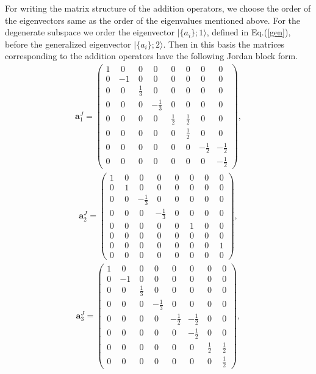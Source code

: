 \documentclass[11pt,a4paper]{book}
\begin{document}
For writing the matrix structure of the addition operators, we choose 
the  order of the eigenvectors same  
as the order of the eigenvalues mentioned above. For the degenerate subspace we 
order the eigenvector $|\{a_i\};1\rangle$, defined in 
Eq.(\ref{gen}), before the generalized eigenvector $|\{a_i\};2\rangle$.  Then in 
this basis the matrices corresponding to the addition operators have the 
following Jordan block form. \begin{align}
 \textbf{a}^J_1 = 
  \begin{pmatrix}
    1 ~&~ 0 ~&~ 0 ~&~ 0 ~&~ 0 ~&~ 0 ~&~ 0 ~&~ 0 \\
    0 ~& -1 &~ 0 ~&~ 0 ~&~ 0 ~&~ 0 ~&~ 0 ~&~ 0 \\
    0 ~&~ 0 ~&~ \frac{1}{3} ~&~ 0 ~&~ 0 ~&~ 0 ~&~ 0 ~&~ 0 \\
    0 ~&~ 0 ~&~ 0 ~& -\frac{1}{3} &~ 0 ~&~ 0 ~&~ 0 ~&~ 0 \\
    0 ~&~ 0 ~&~ 0 ~&~ 0 ~&~ \frac{1}{2} ~&~ \frac{1}{2} ~&~ 0 ~&~ 0 \\
    0 ~&~ 0 ~&~ 0 ~&~ 0 ~&~ 0 ~&~ \frac{1}{2} ~&~ 0 ~&~ 0 \\
    0 ~&~ 0 ~&~ 0 ~&~ 0 ~&~ 0 ~&~ 0 ~& -\frac{1}{2} & -\frac{1}{2} \\
    0 ~&~ 0 ~&~ 0 ~&~ 0 ~&~ 0 ~&~ 0 ~&~ 0 ~& -\frac{1}{2} 
 \end{pmatrix},
\end{align}
\begin{align}
 \textbf{a}^J_2 = 
  \begin{pmatrix}
    1 ~&~ 0 ~&~ 0 ~&~ 0 ~&~ 0 ~&~ 0 ~&~ 0 ~&~ 0 \\
    0 ~&~ 1 ~&~ 0 ~&~ 0 ~&~ 0 ~&~ 0 ~&~ 0 ~&~ 0 \\
    0 ~&~ 0 ~& -\frac{1}{3} &~ 0 ~&~ 0 ~&~ 0 ~&~ 0 ~&~ 0 \\
    0 ~&~ 0 ~&~ 0 ~& -\frac{1}{3} &~ 0 ~&~ 0 ~&~ 0 ~&~ 0 \\
    0 ~&~ 0 ~&~ 0 ~&~ 0 ~&~ 0 ~&~ 1 ~&~ 0 ~&~ 0 \\
    0 ~&~ 0 ~&~ 0 ~&~ 0 ~&~ 0 ~&~ 0 ~&~ 0 ~&~ 0 \\
    0 ~&~ 0 ~&~ 0 ~&~ 0 ~&~ 0 ~&~ 0 ~&~ 0 ~&~ 1 \\
    0 ~&~ 0 ~&~ 0 ~&~ 0 ~&~ 0 ~&~ 0 ~&~ 0 ~&~ 0 
 \end{pmatrix},
\end{align}
\begin{align}
 \textbf{a}^J_3 = 
  \begin{pmatrix}
    1 ~&~ 0 ~&~ 0 ~&~ 0 ~&~ 0 ~&~ 0 ~&~ 0 ~&~ 0 \\
    0 ~& -1 &~ 0 ~&~ 0 ~&~ 0 ~&~ 0 ~&~ 0 ~&~ 0 \\
    0 ~&~ 0 ~&~ \frac{1}{3} ~&~ 0 ~&~ 0 ~&~ 0 ~&~ 0 ~&~ 0 \\
    0 ~&~ 0 ~&~ 0 ~& -\frac{1}{3} &~ 0 ~&~ 0 ~&~ 0 ~&~ 0 \\
    0 ~&~ 0 ~&~ 0 ~&~ 0 ~& -\frac{1}{2} & -\frac{1}{2} &~ 0 ~&~ 0 \\
    0 ~&~ 0 ~&~ 0 ~&~ 0 ~&~ 0 ~& -\frac{1}{2} &~ 0 ~&~ 0 \\
    0 ~&~ 0 ~&~ 0 ~&~ 0 ~&~ 0 ~&~ 0 ~&~ \frac{1}{2} ~&~ \frac{1}{2} \\
    0 ~&~ 0 ~&~ 0 ~&~ 0 ~&~ 0 ~&~ 0 ~&~ 0 ~&~ \frac{1}{2} 
  \end{pmatrix},
\end{align}
\end{document}
